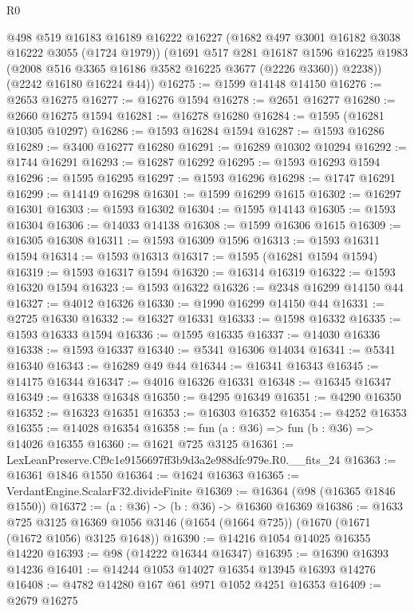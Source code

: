 \begin{lexlean}{R0}
\begin{coremodule}
        @498
        @519
        @16183
        @16189
        @16222
        @16227
        (@1682 @497 @3001 @16182 @3038 @16222 @3055 (@1724 @1979))
        (@1691
          @517
          @281
          @16187
          @1596
          @16225
          @1983
          (@2008 @516 @3365 @16186 @3582 @16225 @3677 (@2226 @3360))
          @2238))
      (@2242 @16180 @16224 @44))
@16275 := @1599 @14148 @14150
@16276 := @2653 @16275
@16277 := @16276 @1594
@16278 := @2651 @16277
@16280 := @2660 @16275 @1594
@16281 := @16278 @16280
@16284 := @1595 (@16281 @10305 @10297)
@16286 := @1593 @16284 @1594
@16287 := @1593 @16286
@16289 := @3400 @16277 @16280
@16291 := @16289 @10302 @10294
@16292 := @1744 @16291
@16293 := @16287 @16292
@16295 := @1593 @16293 @1594
@16296 := @1595 @16295
@16297 := @1593 @16296
@16298 := @1747 @16291
@16299 := @14149 @16298
@16301 := @1599 @16299 @1615
@16302 := @16297 @16301
@16303 := @1593 @16302
@16304 := @1595 @14143
@16305 := @1593 @16304
@16306 := @14033 @14138
@16308 := @1599 @16306 @1615
@16309 := @16305 @16308
@16311 := @1593 @16309 @1596
@16313 := @1593 @16311 @1594
@16314 := @1593 @16313
@16317 := @1595 (@16281 @1594 @1594)
@16319 := @1593 @16317 @1594
@16320 := @16314 @16319
@16322 := @1593 @16320 @1594
@16323 := @1593 @16322
@16326 := @2348 @16299 @14150 @44
@16327 := @4012 @16326
@16330 := @1990 @16299 @14150 @44
@16331 := @2725 @16330
@16332 := @16327 @16331
@16333 := @1598 @16332
@16335 := @1593 @16333 @1594
@16336 := @1595 @16335
@16337 := @14030 @16336
@16338 := @1593 @16337
@16340 := @5341 @16306 @14034
@16341 := @5341 @16340
@16343 := @16289 @49 @44
@16344 := @16341 @16343
@16345 := @14175 @16344
@16347 := @4016 @16326 @16331
@16348 := @16345 @16347
@16349 := @16338 @16348
@16350 := @4295 @16349
@16351 := @4290 @16350
@16352 := @16323 @16351
@16353 := @16303 @16352
@16354 := @4252 @16353
@16355 := @14028 @16354
@16358 := fun (a : @36) => fun (b : @36) => @14026 @16355
@16360 := @1621 @725 @3125
@16361 := LexLeanPreserve.Cf9c1e9156697ff3b9d3a2e988dfc979e.R0.__fits_24
@16363 := @16361 @1846 @1550
@16364 := @1624 @16363
@16365 := VerdantEngine.ScalarF32.divideFinite
@16369 := @16364 (@98 (@16365 @1846 @1550))
@16372 := (a : @36) -> (b : @36) -> @16360 @16369
@16386 := @1633
    @725
    @3125
    @16369
    @1056
    @3146
    (@1654 (@1664 @725))
    (@1670 (@1671 (@1672 @1056) @3125 @1648))
@16390 := @14216 @1054 @14025 @16355 @14220
@16393 := @98 (@14222 @16344 @16347)
@16395 := @16390 @16393 @14236
@16401 := @14244 @1053 @14027 @16354 @13945 @16393 @14276
@16408 := @4782 @14280 @167 @61 @971 @1052 @4251 @16353
@16409 := @2679 @16275

\end{coremodule}
\end{lexlean}
